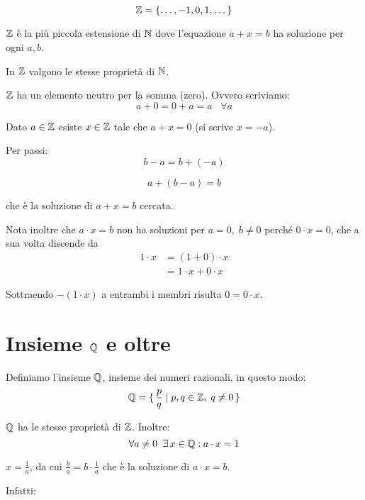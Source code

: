 \begin{equation*}
\mathbb Z = \{\dots, -1, 0, 1, \dots \}
\end{equation*}

$\mathbb Z$ è la più piccola estensione di $\mathbb N$ dove l'equazione $a+x=b$ ha soluzione per ogni $a, b$. 

In $\mathbb Z$ valgono le stesse proprietà di $\mathbb N$.

$\mathbb Z$ ha un elemento neutro per la somma (zero). Ovvero scriviamo:
\begin{equation*}
a + 0 = 0 + a = a \;\;\; \forall a
\end{equation*}

Dato $a \in \mathbb Z$ esiste $x \in \mathbb Z$ tale che $a+x=0$ (si scrive $x=-a$).

Per passi:
\begin{equation*}
b - a = b + (-a)
\end{equation*}


\begin{equation*}
a + (b-a) = b
\end{equation*}

che è la soluzione di $a+x=b$ cercata.

Nota inoltre che $a \cdot x = b$ non ha soluzioni per $a=0,\;b\neq 0$ perché $0 \cdot x = 0$, che a sua volta discende da
\begin{align*}
1 \cdot x &= (1 + 0) \cdot x \\
&=1 \cdot x + 0 \cdot x
\end{align*}

Sottraendo $-(1 \cdot x)$ a entrambi i membri risulta $0 = 0 \cdot x$.

\section{Insieme $\mathbb Q$ e oltre}

Definiamo l'insieme $\mathbb Q$, insieme dei numeri razionali, in questo modo:
\begin{equation*}
\mathbb Q = \set{\frac{p}{q} | p,q \in \mathbb Z,\;q \neq 0}
\end{equation*}

$\mathbb Q$ ha le stesse proprietà di $\mathbb Z$. Inoltre:
\begin{equation*}
\forall a \neq 0 \;\; \exists\, x \in \mathbb Q : a \cdot x = 1
\end{equation*}

$x = \frac{1}{a}$, da cui $\frac{b}{a} = b \cdot \frac{1}{a}$ che è la soluzione di $a \cdot x = b$. 

Infatti:

